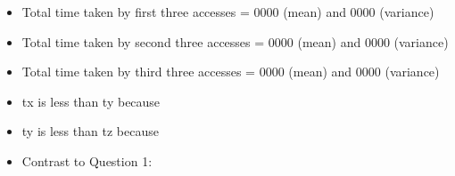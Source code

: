 \documentclass[addpoints,11pt,a4paper]{exam}
\begin{document}
\begin{questions}
\question 
\begin{itemize}
	\item Total time taken by first three accesses = 0000 (mean) and 0000 (variance)
	\item Total time taken by second three accesses = 0000 (mean) and 0000 (variance)
	\item Total time taken by third three accesses = 0000 (mean) and 0000 (variance)
	\item tx is less than ty because
	\item ty is less than tz because
	\item Contrast to Question 1: 
\end{itemize}

\end{questions}
\end{document}
